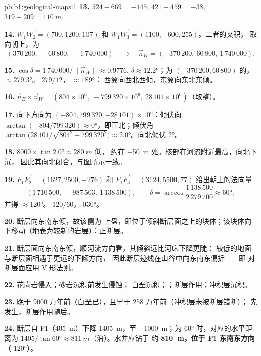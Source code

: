 \begin{solution}{pb:b1:geological-maps:1}
\textbf{13.} $524 - 669 = -145$, $421 - 459 = -38$, $319 - 209 =
\qty{110}{m}$.

\textbf{14.} $\overrightarrow{W_1W_2} = (700, 1200, 107)$ 和
$\overrightarrow{W_1W_3} = (1100, -600, 255)$。二者的叉积，
取向朝上，为
\[
  (370\,200,\ -60\,800,\ -1\,740\,000) \quad\longrightarrow\quad
  \vec n_W = (-370\,200,\ 60\,800,\ 1\,740\,000).
\]

\textbf{15.} $\cos\delta = 1\,740\,000/\|\vec n_W\| \approx 0.9776$, $\delta
\approx \ang{12.2}$；为 $(-370\,200, 60\,800)$ 的，
$\approx \ang{279.3}$。 $279/12$， $\approx \ang{189}$：
西翼向西北西倾，东翼向东北东倾。

\textbf{16.} $\vec n_E \times \vec n_W = (804 \times 10^6,\ -799\,320 \times
10^6,\ 28\,101 \times 10^6)$（取整）。

\textbf{17.} 向下方向为 $(-804, 799\,320, -28\,101) \times
10^6$：倾伏向 $\arctan(-804/799\,320) \approx \ang{0}$，即正北；倾伏角
$\arctan\bigl(28\,101/\sqrt{804^2 + 799\,320^2}\bigr) \approx \ang{2.0}$。向北倾伏 \ang{2}。

\textbf{18.} $8000 \times \tan\ang{2.0} \approx \qty{280}{m}$ 低，
约在 \qty{-50}{m} 处。核部在河流附近最高，向北下沉，
因此其向北闭合，与图所示一致。

\textbf{19.} $\overrightarrow{F_1F_2} = (1627, 2500, -276)$ 和
$\overrightarrow{F_1F_3} = (3124, 5500, 77)$ 给出朝上的法向量
\[
  (1\,710\,500,\ -987\,503,\ 1\,138\,500), \qquad
  \delta = \arccos\frac{1\,138\,500}{2\,279\,700} \approx \ang{60},
\]
并得 $\approx \ang{120}$。 $120/60$，
\ang{030}。

\textbf{20.} 断层向东南东倾，故该侧为
上盘，即位于倾斜断层面之上的块体；该块体向下移动（地表为较新的岩层）：正断层。

\textbf{21.} 断层面向东南东倾，顺河流方向看，其倾斜远比河床下降更陡：
较低的地面与断层面相遇于更远的下倾方向，
因此断层迹线在山谷中向东南东偏折——即
对断层面应用 V 形法则。

\textbf{22.} 花岗岩侵入；砂岩沉积前发生侵蚀；
白垩沉积；；断层作用；冲积层沉积。

\textbf{23.} 晚于 9000 万年前（白垩已），且早于
258 万年前（冲积层未被断层错断）；
先发生，断层作用随后。

\textbf{24.} 断层自 F1（\qty{405}{m}）下降 \qty{1405}{m}，至
\qty{-1000}{m}；为 \ang{60} 时，对应的水平距离为
$1405/\tan\ang{60} \approx \qty{811}{m}$（沿）。水井应钻于
约 \textbf{\qty[text-series-to-math=true]{810}{m}，位于 F1 东南东方向}（ \ang{120}）。
\end{solution}
